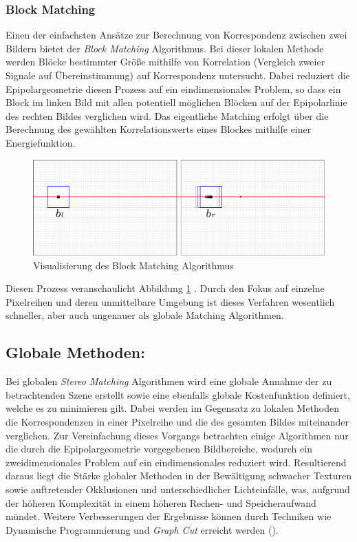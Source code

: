 \subsubsection{Block Matching}
\label{subsec:stereo_matching_bm}
Einen der einfachsten Ansätze zur Berechnung von Korrespondenz zwischen zwei Bildern bietet der \emph{Block Matching} Algorithmus. Bei dieser lokalen Methode werden Blöcke bestimmter Größe mithilfe von Korrelation (Vergleich zweier Signale auf Übereinstimmung) auf Korrespondenz untersucht. Dabei reduziert die Epipolargeometrie diesen Prozess auf ein eindimensionales Problem, so dass ein Block im linken Bild mit allen potentiell möglichen Blöcken auf der Epipolarlinie des rechten Bildes verglichen wird. Das eigentliche Matching erfolgt über die Berechnung des gewählten Korrelationswerts eines Blockes mithilfe einer Energiefunktion.

\begin{figure}[h]
	\begin{center}
		\includegraphics[width=13.5cm]{img/block_matching.pdf}
	\end{center}
	\caption{Visualisierung des Block Matching Algorithmus}
	\label{fig:block_matching}
\end{figure}

\noindent
Diesen Prozess veranschaulicht Abbildung \ref{fig:block_matching} . Durch den Fokus auf einzelne Pixelreihen und deren unmittelbare Umgebung ist dieses Verfahren wesentlich schneller, aber auch ungenauer als globale Matching Algorithmen. 


\subsection{Globale Methoden:}
\label{subsec:global_methods}
Bei globalen \emph{Stereo Matching} Algorithmen wird eine globale Annahme der zu betrachtenden Szene erstellt sowie eine ebenfalls globale Kostenfunktion definiert, welche es zu minimieren gilt. Dabei werden im Gegensatz zu lokalen Methoden die Korrespondenzen in einer Pixelreihe und die des gesamten Bildes miteinander verglichen. Zur Vereinfachung dieses Vorgangs betrachten einige Algorithmen nur die durch die Epipolargeometrie vorgegebenen Bildbereiche, wodurch ein zweidimensionales Problem auf ein eindimensionales reduziert wird. Resultierend daraus liegt die Stärke globaler Methoden in der Bewältigung schwacher Texturen sowie auftretender Okklusionen und unterschiedlicher Lichteinfälle, was, aufgrund der höheren Komplexität in einem höheren Rechen- und Speicheraufwand mündet. Weitere Verbesserungen der Ergebnisse können durch Techniken wie Dynamische Programmierung und \emph{Graph Cut} erreicht werden (\cite{zureiki2008stereo}).


